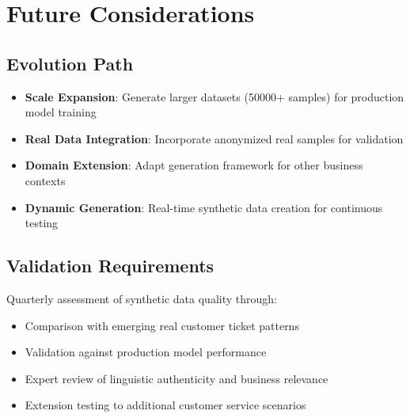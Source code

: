 \documentclass[11pt]{article}
\begin{document}
\section{Future Considerations}

\subsection{Evolution Path}
\begin{itemize}
\item \textbf{Scale Expansion}: Generate larger datasets (50000+ samples) for production model training
\item \textbf{Real Data Integration}: Incorporate anonymized real samples for validation
\item \textbf{Domain Extension}: Adapt generation framework for other business contexts
\item \textbf{Dynamic Generation}: Real-time synthetic data creation for continuous testing
\end{itemize}

\subsection{Validation Requirements}
Quarterly assessment of synthetic data quality through:
\begin{itemize}
\item Comparison with emerging real customer ticket patterns
\item Validation against production model performance
\item Expert review of linguistic authenticity and business relevance
\item Extension testing to additional customer service scenarios
\end{itemize}
\end{document}
